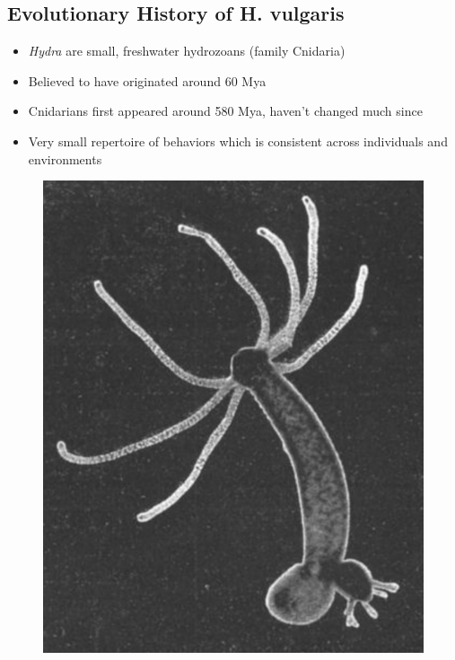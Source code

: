 \documentclass{article}
\begin{document}
\subsection{Evolutionary History of H. vulgaris}
\begin{itemize}
\item \textit{Hydra} are small, freshwater hydrozoans (family Cnidaria)
\item Believed to have originated around 60 Mya
\item Cnidarians first appeared around 580 Mya, haven't changed much since
\item Very small repertoire of behaviors which is consistent across individuals and environments
\end{itemize}
\begin{figure}
\center
\includegraphics[scale=0.20]{hydra.png}
\end{figure}
\end{document}
